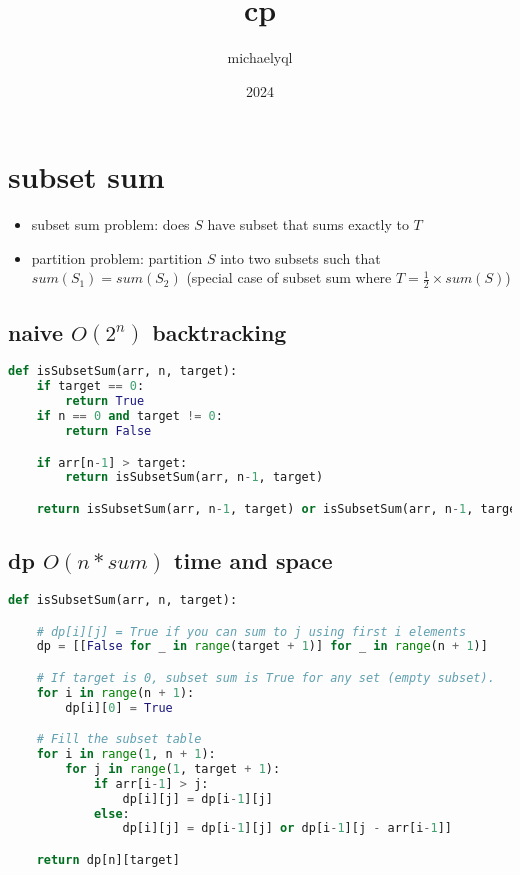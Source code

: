 \documentclass[11pt]{article}
\begin{document}
\title{cp}
\author{michaelyql}
\date{2024}
\maketitle

\newpage



\section{subset sum}

\begin{itemize}
\item subset sum problem: does $S$ have subset that sums exactly to $T$ 
\item partition problem: partition $S$ into two subsets such that $sum(S_{1}) = sum(S_{2})$ (special case of subset sum where $T = \frac{1}{2}\times sum(S)$)
\end{itemize}

\subsection{naive $O(2^{n})$ backtracking}
\begin{lstlisting}[language=Python]
def isSubsetSum(arr, n, target):
    if target == 0:
        return True
    if n == 0 and target != 0:
        return False

    if arr[n-1] > target:
        return isSubsetSum(arr, n-1, target)

    return isSubsetSum(arr, n-1, target) or isSubsetSum(arr, n-1, target - arr[n-1])
\end{lstlisting}

\subsection{dp $O(n * sum)$ time and space}

\begin{lstlisting}[language=Python]
def isSubsetSum(arr, n, target):

    # dp[i][j] = True if you can sum to j using first i elements
    dp = [[False for _ in range(target + 1)] for _ in range(n + 1)]

    # If target is 0, subset sum is True for any set (empty subset).
    for i in range(n + 1):
        dp[i][0] = True

    # Fill the subset table
    for i in range(1, n + 1):
        for j in range(1, target + 1):
            if arr[i-1] > j:
                dp[i][j] = dp[i-1][j]
            else:
                dp[i][j] = dp[i-1][j] or dp[i-1][j - arr[i-1]]

    return dp[n][target]
\end{lstlisting}
\end{document}
